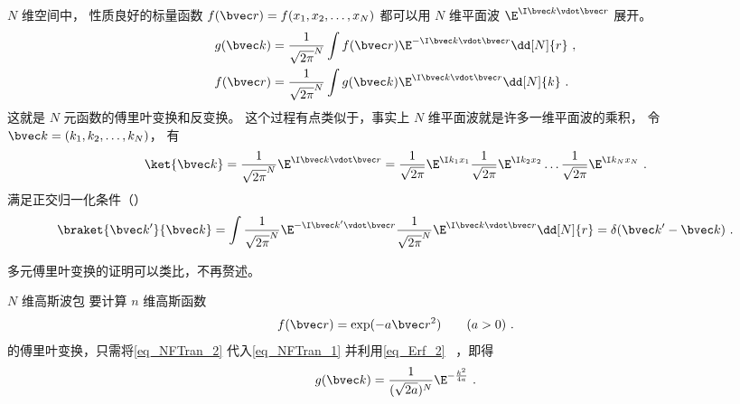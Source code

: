 

$N$ 维空间中， 性质良好的标量函数 $f(\bvec r) = f(x_1, x_2, \dots, x_N)$ 都可以用 $N$ 维平面波 $\E^{\I \bvec k\vdot \bvec r}$ 展开。
\begin{align}
g(\bvec k) &= \frac{1}{\sqrt{2\pi}^N} \int f(\bvec r) \E^{-\I \bvec k \vdot \bvec r} \dd[N]{r}\label{eq_NFTran_1}~,\\
f(\bvec r) &= \frac{1}{\sqrt{2\pi}^N} \int g(\bvec k) \E^{\I \bvec k \vdot \bvec r} \dd[N]{k}~.
\end{align}
这就是 $N$ 元函数的傅里叶变换和反变换。 这个过程有点类似于，事实上 $N$ 维平面波就是许多一维平面波的乘积， 令 $\bvec k = (k_1, k_2, \dots, k_N)$， 有
\begin{equation}
\ket{\bvec k} = \frac{1}{\sqrt{2\pi}^N}\E^{\I \bvec k \vdot \bvec r} = \frac{1}{\sqrt{2\pi}} \E^{\I k_1 x_1} \frac{1}{\sqrt{2\pi}} \E^{\I k_2 x_2} \dots \frac{1}{\sqrt{2\pi}} \E^{\I k_N x_N}~.
\end{equation}
满足正交归一化条件（）
\begin{equation}
\braket{\bvec k'}{\bvec k} = \int \frac{1}{\sqrt{2\pi}^N}\E^{-\I \bvec k' \vdot \bvec r} \frac{1}{\sqrt{2\pi}^N}\E^{\I \bvec k \vdot \bvec r} \dd[N]{r} = \delta(\bvec k'- \bvec k)~.
\end{equation}

多元傅里叶变换的证明可以类比，不再赘述。

\begin{example}{$N$ 维高斯波包}
要计算 $n$ 维高斯函数
\begin{equation}\label{eq_NFTran_2}
f(\bvec r) = \exp(-a\bvec r^2) \qquad (a > 0)~.
\end{equation}
的傅里叶变换，只需将\autoref{eq_NFTran_2} 代入\autoref{eq_NFTran_1} 并利用\autoref{eq_Erf_2}~ ，即得
\begin{equation}
g(\bvec k) = \frac{1}{(\sqrt{2a})^N}\E^{-\frac{k^2}{4a}}~.
\end{equation}
\end{example}
